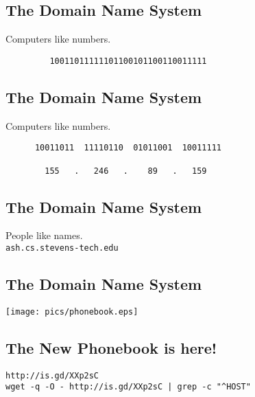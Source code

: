 \documentclass[xga]{xdvislides}
\begin{document}
\subsection{The Domain Name System}
\vspace{.5in}
\begin{center}
	\Huge
	Computers like numbers. \\
\vspace{.5in}
\begin{verbatim}
         10011011111101100101100110011111
\end{verbatim}
\end{center}
\Normalsize

\subsection{The Domain Name System}
\vspace{.5in}
\begin{center}
	\Huge
	Computers like numbers. \\
\vspace{.5in}
\begin{verbatim}
      10011011  11110110  01011001  10011111

        155   .   246   .    89   .   159
\end{verbatim}
\end{center}
\Normalsize

\subsection{The Domain Name System}
\vspace{.5in}
\begin{center}
	\Huge
	People like names. \\
\vspace{.5in}
\verb+ash.cs.stevens-tech.edu+
\end{center}
\Normalsize


\subsection{The Domain Name System}
\vspace*{\fill}
\begin{center}
	\texttt{[image: pics/phonebook.eps]}
\end{center}
\vspace*{\fill}

\subsection{The New Phonebook is here!}
\vspace*{\fill}
\begin{center}
	\verb+http://is.gd/XXp2sC+ \\
	\addvspace{.5in}
	\verb+wget -q -O - http://is.gd/XXp2sC | grep -c "^HOST"+
\end{center}
\vspace*{\fill}
\end{document}
